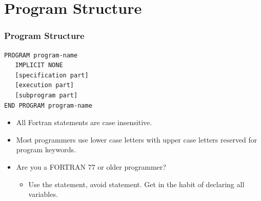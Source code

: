 \documentclass[10pt,t]{beamer}
\begin{document}
\section{Program Structure}
\begin{frame}
  \frametitle{Program Structure}
    \begin{eblock}{}
      \begin{lstlisting}[language={[90]Fortran}]
PROGRAM program-name
   IMPLICIT NONE
   [specification part]
   [execution part]
   [subprogram part]
END PROGRAM program-name
      \end{lstlisting}
    \end{eblock}
  \begin{itemize}
    \item All Fortran statements are case insensitive.
    \item Most programmers use lower case letters with upper case letters reserved for program keywords.
    \item Are you a FORTRAN 77 or older programmer?
    \begin{itemize}
      \item Use the  statement, avoid  statement. Get in the habit of declaring all variables.
    \end{itemize}
  \end{itemize}
\end{frame}
\end{document}
